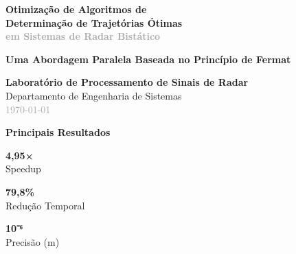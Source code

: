 \documentclass[12pt,a4paper]{article}
\begin{document}
\begin{titlepage}
\centering


\vspace{1cm}

{\Huge\textcolor{primaryblue}{\textbf{Otimização de Algoritmos de}}}\\[0.3cm]
{\Huge\textcolor{primaryblue}{\textbf{Determinação de Trajetórias Ótimas}}}\\[0.2cm]
{\Large\textcolor{darkgray}{\textbf{em Sistemas de Radar Bistático}}}\\[0.8cm]

\begin{tcolorbox}[colback=secondaryblue!20,colframe=primaryblue,width=0.8\textwidth,arc=5pt]
\centering
{\large\textcolor{primaryblue}{\textbf{Uma Abordagem Paralela Baseada no Princípio de Fermat}}}
\end{tcolorbox}

\vspace{2cm}

\begin{destacadoverde}
\centering
{\Large\textbf{Laboratório de Processamento de Sinais de Radar}}\\[0.3cm]
{\large Departamento de Engenharia de Sistemas}\\[0.2cm]
{\normalsize\textcolor{darkgray}{\today}}
\end{destacadoverde}

\vspace{1.5cm}

\begin{tcolorbox}[colback=lightgray,colframe=darkgray,arc=8pt,width=0.9\textwidth]
\centering
\textcolor{primaryblue}{\textbf{Principais Resultados}}\\[0.2cm]
\begin{minipage}{0.25\textwidth}
\centering
{\Huge\textcolor{accentgreen}{\textbf{4,95×}}}\\
{\small Speedup}
\end{minipage}
\begin{minipage}{0.25\textwidth}
\centering
{\Huge\textcolor{primaryblue}{\textbf{79,8\%}}}\\
{\small Redução Temporal}
\end{minipage}
\begin{minipage}{0.25\textwidth}
\centering
{\Huge\textcolor{warningorange}{\textbf{10⁻⁶}}}\\
{\small Precisão (m)}
\end{minipage}
\end{tcolorbox}

\vfill

\end{titlepage}
\end{document}
